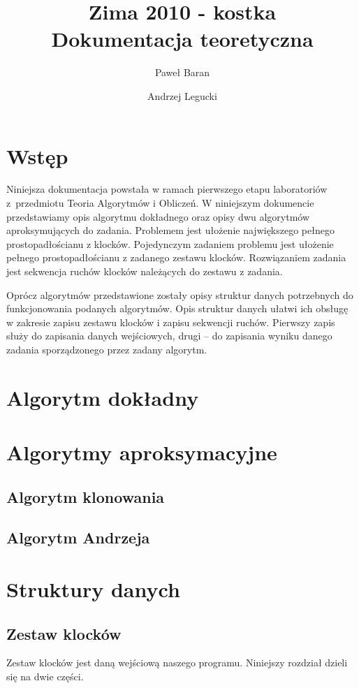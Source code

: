 \documentclass[12pt]{article}
\title{
\Huge{
Zima 2010 - kostka
} \\[0.5em]
\LARGE{
Dokumentacja teoretyczna
}
}
\author{
	Paweł Baran \and Andrzej Legucki
}
\begin{document}
\maketitle

\newpage

\tableofcontents

\newpage
\section{Wstęp}
Niniejsza dokumentacja powstała w ramach pierwszego etapu laboratoriów
z~przedmiotu Teoria Algorytmów i Obliczeń. W niniejszym dokumencie
przedstawiamy opis algorytmu dokładnego oraz opisy dwu algorytmów
aproksymujących do zadania. Problemem jest ułożenie największego
pełnego prostopadłościanu z klocków. Pojedynczym zadaniem problemu jest
ułożenie pełnego prostopadłościanu z zadanego zestawu klocków.
Rozwiązaniem zadania jest sekwencja ruchów klocków należących do zestawu
z zadania.

Oprócz algorytmów przedstawione zostały opisy struktur danych potrzebnych
do funkcjonowania podanych algorytmów. Opis struktur danych ułatwi ich
obsługę w zakresie zapisu zestawu klocków i zapisu sekwencji ruchów.
Pierwszy zapis służy do zapisania danych wejściowych, drugi -- do zapisania
wyniku danego zadania sporządzonego przez zadany algorytm.

\section{Algorytm dokładny}

\section{Algorytmy aproksymacyjne}

\subsection{Algorytm klonowania}

\subsection{Algorytm Andrzeja}

\section{Struktury danych}

\subsection{Zestaw klocków}
Zestaw klocków jest daną wejściową naszego programu. Niniejszy rozdział
dzieli się na dwie części.
\end{document}
